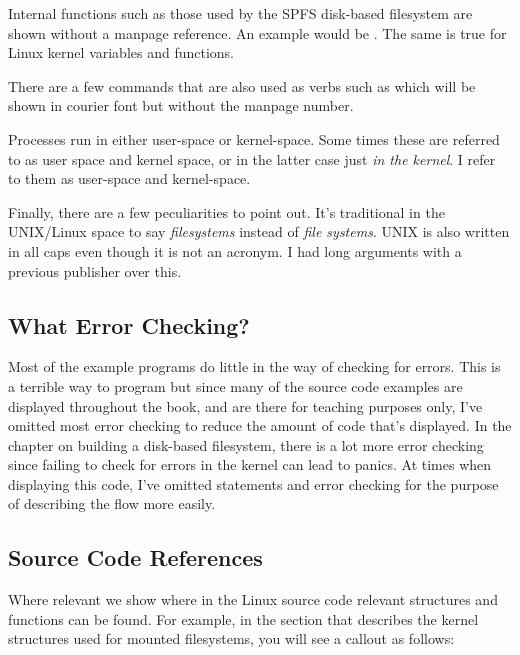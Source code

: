 Internal functions such as those used by the SPFS disk-based filesystem are shown without a manpage reference. An example would be . The same is true for Linux kernel variables and functions.

There are a few commands that are also used as verbs such as  which will be shown in courier font but without the manpage number.

Processes run in either user-space or kernel-space. Some times these are referred to as user space and kernel space, or in the latter case just \textit{in the kernel}. I refer to them as user-space and kernel-space.

Finally, there are a few peculiarities to point out. It's traditional in the UNIX/Linux space to say \textit{filesystems} instead of \textit{file systems}. UNIX is also written in all caps even though it is not an acronym. I had long arguments with a previous publisher over this.


\subsection{What Error Checking?}

Most of the example programs do little in the way of checking for errors. This is a terrible way to program but since many of the source code examples are displayed throughout the book, and are there for teaching purposes only, I've omitted most error checking to reduce the amount of code that's displayed. In the chapter on building a disk-based filesystem, there is a lot more error checking since failing to check for errors in the kernel can lead to panics. At times when displaying this code, I've omitted  statements and error checking for the purpose of describing the flow more easily.


\subsection{Source Code References}

Where relevant we show where in the Linux source code relevant structures and functions can be found. For example, in the section that describes the kernel structures used for mounted filesystems, you will see a callout as follows:

